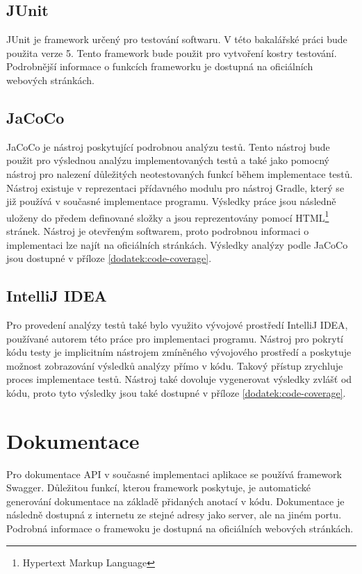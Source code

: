     \subsection{JUnit}
        JUnit je framework určený pro testování softwaru. V této bakalářské práci bude použita verze 5. Tento framework bude použit pro vytvoření kostry testování. Podrobnější informace o funkcích frameworku je dostupná na oficiálních webových stránkách\cite{junit-doc}.
        
    \subsection{JaCoCo}\label{resere:testovani:jacoco}
        JaCoCo je nástroj poskytující podrobnou analýzu testů. Tento nástroj bude použit pro výslednou analýzu implementovaných testů a také jako pomocný nástroj pro nalezení důležitých neotestovaných funkcí během implementace testů. Nástroj existuje v reprezentaci přídavného modulu pro nástroj Gradle, který se již používá v současné implementace programu. Výsledky práce jsou následně uloženy do předem definované složky a jsou reprezentovány pomocí HTML\footnote{Hypertext Markup Language} stránek. Nástroj je otevřeným softwarem, proto podrobnou informaci o implementaci lze najít na oficiálních stránkách\cite{jacoco-implementation}. Výsledky analýzy podle JaCoCo jsou dostupné v příloze \ref{dodatek:code-coverage}.
        
    \subsection{IntelliJ IDEA}\label{resere:testovani:intellij-idea}
        Pro provedení analýzy testů také bylo využito vývojové prostředí IntelliJ IDEA, používané autorem této práce pro implementaci programu. Nástroj pro pokrytí kódu testy je implicitním nástrojem zmíněného vývojového prostředí a poskytuje možnost zobrazování výsledků analýzy přímo v kódu. Takový přístup zrychluje proces implementace testů. Nástroj také dovoluje vygenerovat výsledky zvlášť od kódu, proto tyto výsledky jsou také dostupné v příloze \ref{dodatek:code-coverage}.


\section{Dokumentace}\label{resere:dokumentace}
    Pro dokumentace API v současné implementaci aplikace se používá framework Swagger. Důležitou funkcí, kterou framework poskytuje, je automatické generování dokumentace na základě přidaných anotací v kódu. Dokumentace je následně dostupná z internetu ze stejné adresy jako server, ale na jiném portu. Podrobná informace o framewoku je dostupná na oficiálních webových stránkách\cite{swagger-doc}.
    
